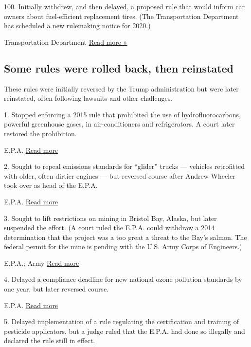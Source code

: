 100. Initially withdrew, and then delayed, a proposed rule that would
inform car owners about fuel-efficient replacement tires. (The
Transportation Department has scheduled a new rulemaking notice for
2020.)

 Transportation Department \textbar{}
\href{https://www.reginfo.gov/public/do/eAgendaViewRule?pubId=201904\&RIN=2127-AK76}{Read
more »}

\hypertarget{some-rules-were-rolled-back-then-reinstated}{%
\subsection{Some rules were rolled back, then
reinstated}\label{some-rules-were-rolled-back-then-reinstated}}

These rules were initially reversed by the Trump administration but were
later reinstated, often following lawsuits and other challenges.

1. Stopped enforcing a 2015 rule that prohibited the use of
hydrofluorocarbons, powerful greenhouse gases, in air-conditioners and
refrigerators. A court later restored the prohibition.

 E.P.A. \textbar{} \href{https://www.eenews.net/stories/1062812525}{Read
more}

2. Sought to repeal emissions standards for ``glider'' trucks ---
vehicles retrofitted with older, often dirtier engines --- but reversed
course after Andrew Wheeler took over as head of the E.P.A.

 E.P.A. \textbar{}
\href{https://www.nytimes3xbfgragh.onion/2018/07/27/climate/wheeler-pruitt-glider-truck-reversal.html}{Read
more}

3. Sought to lift restrictions on mining in Bristol Bay, Alaska, but
later suspended the effort. (A court ruled the E.P.A. could withdraw a
2014 determination that the project was a too great a threat to the
Bay's salmon. The federal permit for the mine is pending with the U.S.
Army Corps of Engineers.)

 E.P.A.; Army \textbar{}
\href{https://www.adn.com/business-economy/energy/2020/04/20/pebble-mine-opponents-lose-court-case-over-2014-epa-report/}{Read
more}

4. Delayed a compliance deadline for new national ozone pollution
standards by one year, but later reversed course.

 E.P.A. \textbar{}
\href{https://eelp.law.harvard.edu/2017/09/ozone-national-ambient-air-quality-standards/}{Read
more}

5. Delayed implementation of a rule regulating the certification and
training of pesticide applicators, but a judge ruled that the E.P.A. had
done so illegally and declared the rule still in effect.

